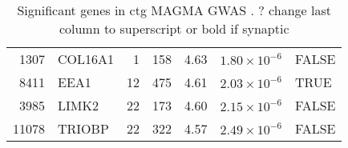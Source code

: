 \begin{table}[ht]
\begin{tabular}{rlrrrrl}
  1307 & COL16A1 &   1 & 158 & 4.63 & $1.80 \times 10^{-6}$ & FALSE \\ 
  8411 & EEA1 &  12 & 475 & 4.61 & $2.03 \times 10^{-6}$ & TRUE \\ 
  3985 & LIMK2 &  22 & 173 & 4.60 & $2.15 \times 10^{-6}$ & FALSE \\ 
  11078 & TRIOBP &  22 & 322 & 4.57 & $2.49 \times 10^{-6}$ & FALSE \\ 
   \hline
\end{tabular}
\caption{Significant genes in ctg MAGMA GWAS \cite{sniekers2017genome}. ? change last column to superscript or bold if synaptic} 
\label{tab:Significant genes in ctg MAGMA GWAS}
\end{table}





